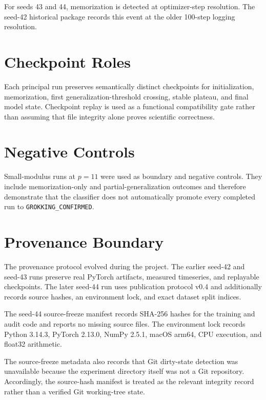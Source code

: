 For seeds 43 and 44, memorization is detected at optimizer-step resolution. The seed-42 historical package records this event at the older 100-step logging resolution.

\section{Checkpoint Roles}
Each principal run preserves semantically distinct checkpoints for initialization, memorization, first generalization-threshold crossing, stable plateau, and final model state. Checkpoint replay is used as a functional compatibility gate rather than assuming that file integrity alone proves scientific correctness.

\section{Negative Controls}
Small-modulus runs at $p=11$ were used as boundary and negative controls. They include memorization-only and partial-generalization outcomes and therefore demonstrate that the classifier does not automatically promote every completed run to \texttt{GROKKING\_CONFIRMED}.

\section{Provenance Boundary}
The provenance protocol evolved during the project. The earlier seed-42 and seed-43 runs preserve real PyTorch artifacts, measured timeseries, and replayable checkpoints. The later seed-44 run uses publication protocol v0.4 and additionally records source hashes, an environment lock, and exact dataset split indices.

The seed-44 source-freeze manifest records SHA-256 hashes for the training and audit code and reports no missing source files. The environment lock records Python 3.14.3, PyTorch 2.13.0, NumPy 2.5.1, macOS arm64, CPU execution, and float32 arithmetic.

The source-freeze metadata also records that Git dirty-state detection was unavailable because the experiment directory itself was not a Git repository. Accordingly, the source-hash manifest is treated as the relevant integrity record rather than a verified Git working-tree state.

